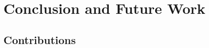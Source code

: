 \chapter{Conclusion and Future Work}
\label{cha:conclusion}

\section{Contributions}
\label{sec:contributions}

\begin{comment}
What are the main contributions made to the field?
How significant are these contributions?
Also discuss the contributions in terms of the goals and research questions formulated in the Introduction.

The contributions section will normally contain everything that you address in the abstract, but in an extended form and quite possibly additional issues that cannot be included in the abstract.
An obvious difference is that when the reader has come this far in the text, she/he should be quite familiar with the work, but while reading the abstract they will have little to no knowledge of the work.

The section ``Contributions'' in Chapter~\ref{cha:introduction} differs from this one in that the former is just a list of the main bits, while this section should explain them in more detail.
However, basically the same items should appear in both sections.

\section{Future Work}
\label{sec:futureWork}

Consider where you would like to extend or improve this work, or how somebody else could continue it.
These extensions might either be continuing the ongoing direction or taking a side direction that became obvious during the work.
Further, possible solutions to limitations in the work conducted, highlighted in Section~\ref{sec:discussion} may be presented.

Note that in the Specialisation Project Report, the Future Work section will be a key part of your plan for the novel work to be carried out in the next semester,
while in the Master's Thesis, the Future Work section rather will point to issues that others might be interested in addressing.
This can include options and alternatives that you did not try out yourself, or potential improvements and extensions to your experiments or system.
\end{comment}